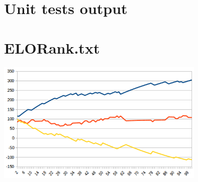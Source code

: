 \section{Unit tests output}

\begin{scriptsize}
\begin{ttfamily}

\end{ttfamily}
\end{scriptsize}

\section{ELORank.txt}

\begin{scriptsize}
\begin{ttfamily}

\end{ttfamily}
\end{scriptsize}

\begin{center}
\includegraphics[width=10cm]{elorank.png}
\end{center} 
